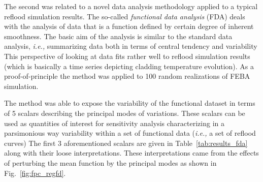 \documentclass[11pt,titlepage]{article}
\begin{document}
The second was related to a novel data analysis methodology applied to a 
typical reflood simulation results.
The so-called \textit{functional data analysis} (FDA) deals with the 
analysis of data that is a function defined by certain degree of inherent 
smoothness. 
The basic aim of the analysis is similar to the standard data analysis, 
\textit{i.e.,} summarizing data both in terms of central tendency and 
variability 
This perspective of looking at data fits rather well to reflood simulation 
results (which is basically a time series depicting cladding temperature 
evolution).
As a proof-of-principle the method was applied to 100 random realizations
of FEBA simulation.

The method was able to expose the variability of the functional dataset 
in terms of 5 scalars describing the principal modes of variations.
These scalars can be used as quantities of interest for sensitivity 
analysis characterizing in a parsimonious way variability within a 
set of functional data (\textit{i.e.,} a set of reflood curves)
The first 3 aforementioned scalars are given in Table~\ref{tab:results_fda} 
along with their loose interpretations. 
These interpretations came from the effects of perturbing the mean function 
by the principal modes as shown in Fig.~\ref{fig:fpc_regfd}.
    
\end{document}
